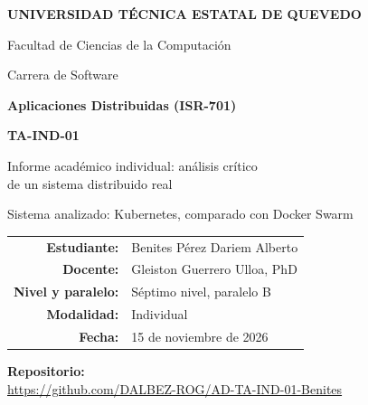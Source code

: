 \documentclass[12pt,a4paper]{article}
\newcommand{\repourl}{https://github.com/DALBEZ-ROG/AD-TA-IND-01-Benites}
\newcommand{\fecha}{15 de noviembre de 2026}
\begin{document}
\begin{center}
  {\Large\bfseries UNIVERSIDAD TÉCNICA ESTATAL DE QUEVEDO\par}
  \vspace{4pt}
  {\large Facultad de Ciencias de la Computación\par}
  {\large Carrera de Software\par}
  \vspace{1.6cm}
  {\large\bfseries Aplicaciones Distribuidas (ISR-701)\par}
  \vspace{0.8cm}
  {\Large\bfseries TA-IND-01\par}
  \vspace{4pt}
  {\large Informe académico individual: análisis crítico\\ de un sistema distribuido real\par}
  \vspace{4pt}
  {Sistema analizado: Kubernetes, comparado con Docker Swarm\par}
\end{center}

\vspace{1.4cm}
\begin{center}
\renewcommand{\arraystretch}{1.5}
\begin{tabular}{>{\bfseries}r l}
  Estudiante:  & Benites Pérez Dariem Alberto \\
  Docente:     & Gleiston Guerrero Ulloa, PhD \\
  Nivel y paralelo: & Séptimo nivel, paralelo B \\
  Modalidad:   & Individual \\
  Fecha:       & \fecha \\
\end{tabular}
\end{center}

\vfill
\begin{center}
  {\bfseries Repositorio:}\\[4pt]
  {\small\url{\repourl}}
\end{center}
\vspace{1cm}
\end{document}

